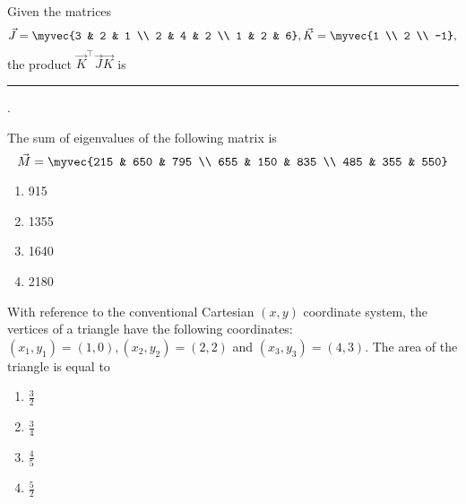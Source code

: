\item Given the matrices 
\[
\vec{J} = \myvec{3 & 2 & 1 \\ 2 & 4 & 2 \\ 1 & 2 & 6}, 
\vec{K} = \myvec{1 \\ 2 \\ -1},
\]
the product $\vec{K}^{\top} \vec{J} \vec{K}$ is \rule{3cm}{0.15mm}. \hfill{}

\item The sum of eigenvalues of the following matrix is \hfill{}
\[
\vec{M} = \myvec{215 & 650 & 795 \\ 655 & 150 & 835 \\ 485 & 355 & 550}
\]

\begin{multicols}{4}
\begin{enumerate}
\item 915
\item 1355
\item 1640
\item 2180
\end{enumerate}
\end{multicols}
\item With reference to the conventional Cartesian $(x,y)$ coordinate system, the vertices of a triangle have the following coordinates: $(x_1,y_1) = (1,0), (x_2,y_2) = (2,2)$ and $(x_3,y_3) = (4,3)$. The area of the triangle is equal to \hfill{}
\begin{multicols}{4}
\begin{enumerate}
\item $\frac{3}{2}$
\item $\frac{3}{4}$
\item $\frac{4}{5}$
\item $\frac{5}{2}$
\end{enumerate}
\end{multicols}

